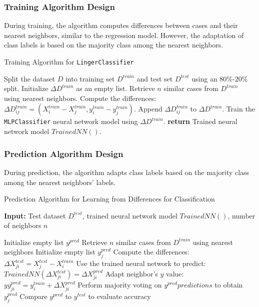 \documentclass[a4paper, 12pt]{report}
\begin{document}
\subsubsection{Training Algorithm Design}
During training, the algorithm computes differences between cases and their nearest neighbors, similar to the regression model. 
However, the adaptation of class labels is based on the majority class among the nearest neighbors.

\begin{algorithm}
    \caption{Training Algorithm for \texttt{LingerClassifier}}
    \label{alg:linger_classifier_train}
    \begin{algorithmic}
        \State Split the dataset $D$ into training set $D^{train}$ and test set $D^{test}$ using an $80\%$-$20\%$ split.
        \State Initialize $\Delta D^{train}$ as an empty list.
            \State Retrieve $n$ similar cases from $D^{train}$ using nearest neighbors.
                \State Compute the differences: $\Delta D^{train}_{ij} = (X^{train}_i - X^{train}_j, y^{train}_i - y^{train}_j)$.
                \State Append $\Delta D^{train}_{ij}$ to $\Delta D^{train}$.
            \EndFor
        \EndFor
        \State Train the \texttt{MLPClassifier} neural network model using $\Delta D^{train}$.
        \State \textbf{return} Trained neural network model $Trained NN()$.
    \end{algorithmic}
\end{algorithm}

\subsubsection{Prediction Algorithm Design}
During prediction, the algorithm adapts class labels based on the majority class among the nearest neighbors' labels.

\begin{algorithm}
	\caption{Prediction Algorithm for Learning from Differences for Classification}
	\label{alg:learning_from_differences_predict_classification}
	\textbf{Input:} Test dataset $D^{test}$, trained neural network model $Trained NN()$, number of neighbors $n$
	\begin{algorithmic}[1]
        \State Initialize empty list $y^{pred}$
			\State Retrieve $n$ similar cases from $D^{train}$ using nearest neighbors
			\State Initialize empty list $y^{pred}_j$
				\State Compute the differences: $\Delta X^{test}_{ji} = X^{test}_j - X^{train}_i$
				\State Use the trained neural network to predict: $Trained NN(\Delta X^{test}_{ji}) = \Delta X^{pred}_{ji}$
				\State Adapt neighbor's $y$ value: $yy^{pred}_{ji} = y^{train}_i + \Delta X^{pred}_{ji}$
			\EndFor
			\State Perform majority voting on $y^{pred}predictions$ to obtain $y^{pred}_j$
		\EndFor
		\State Compare $y^{pred}$ to $y^{test}$ to evaluate accuracy
	\end{algorithmic}
\end{algorithm}
\end{document}
